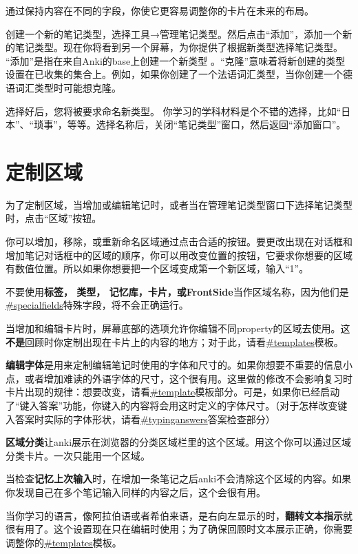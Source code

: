 \documentclass[a4paper]{book}
\begin{document}
	通过保持内容在不同的字段，你使它更容易调整你的卡片在未来的布局。
	
	创建一个新的笔记类型，选择工具→管理笔记类型。然后点击“添加”，添加一个新的笔记类型。现在你将看到另一个屏幕，为你提供了根据新类型选择笔记类型。 “添加”是指在来自Anki的base上创建一个新类型 。“克隆”意味着将新创建的类型设置在已收集的集合上。例如，如果你创建了一个法语词汇类型，当你创建一个德语词汇类型时可能想克隆。
	
	选择好后，您将被要求命名新类型。 你学习的学科材料是个不错的选择，比如“日本”、“琐事”，等等。选择名称后，关闭“笔记类型”窗口，然后返回“添加窗口”。
	
	\section{定制区域}
	
	为了定制区域，当增加或编辑笔记时，或者当在管理笔记类型窗口下选择笔记类型时，点击“区域”按钮。
	
	你可以增加，移除，或重新命名区域通过点击合适的按钮。要更改出现在对话框和增加笔记对话框中的区域的顺序，你可以用改变位置的按钮，它要求你想要的区域有数值位置。所以如果你想要把一个区域变成第一个新区域，输入“1”。
	
	
	\begin{shaded}
		不要使用\textbf{标签， 类型， 记忆库，卡片，或FrontSide}当作区域名称，因为他们是\url{#specialfields}特殊字段，将不会正确运行。
	\end{shaded}
	
	当增加和编辑卡片时，屏幕底部的选项允许你编辑不同property的区域去使用。这\textbf{不是}回顾时你定制出现在卡片上的内容的地方；对于此，请看\url{#templates}模板。
	
	\textbf{编辑字体}是用来定制编辑笔记时使用的字体和尺寸的。如果你想要不重要的信息小点，或者增加难读的外语字体的尺寸，这个很有用。这里做的修改不会影响复习时卡片出现的规律：想要改变，请看\url{#template}模板部分。可是，如果你已经启动了“键入答案”功能，你键入的内容将会用这时定义的字体尺寸。（对于怎样改变键入答案时实际的字体形状，请看\url{#typinganswers}答案检查部分）
	
	\textbf{区域分类}让anki展示在浏览器的分类区域栏里的这个区域。用这个你可以通过区域分类卡片。一次只能用一个区域。
	
	当检查\textbf{记忆上次输入}时，在增加一条笔记之后anki不会清除这个区域的内容。如果你发现自己在多个笔记输入同样的内容之后，这个会很有用。
	
	当你学习的语言，像阿拉伯语或者希伯来语，是右向左显示的时，\textbf{翻转文本指示}就很有用了。这个设置现在只在编辑时使用；为了确保回顾时文本展示正确，你需要调整你的\url{#templates}模板。
	
\end{document}
